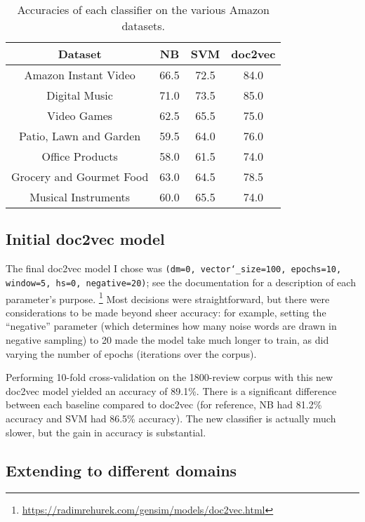 \documentclass[12pt,a4paper,twoside,twocolumn]{article}
\begin{document}
\begin{table*}[t]
\centering
\begin{tabular}{|c|c|c|c|}
\hline
\textbf{Dataset} & \textbf{NB} & \textbf{SVM} & \textbf{doc2vec}\\ \hline

Amazon Instant Video & 66.5 & 72.5 & 84.0 \\ \hline
Digital Music & 71.0 & 73.5 & 85.0 \\ \hline
Video Games & 62.5 & 65.5 & 75.0 \\ \hline
Patio, Lawn and Garden & 59.5 & 64.0 & 76.0 \\ \hline
Office Products & 58.0 & 61.5 & 74.0 \\ \hline
Grocery and Gourmet Food & 63.0 & 64.5 & 78.5 \\ \hline
Musical Instruments & 60.0 & 65.5 & 74.0 \\ \hline

\end{tabular}
\caption{Accuracies of each classifier on the various Amazon datasets.}
\end{table*}

\subsection{Initial doc2vec model}

The final doc2vec model I chose was \texttt{(dm=0, vector\char`_size=100, epochs=10, window=5, hs=0, negative=20)}; see the documentation for a description of each parameter's purpose. \footnote{\url{https://radimrehurek.com/gensim/models/doc2vec.html}} Most decisions were straightforward, but there were considerations to be made beyond sheer accuracy: for example, setting the ``negative'' parameter (which determines how many noise words are drawn in negative sampling) to 20 made the model take much longer to train, as did varying the number of epochs (iterations over the corpus).

Performing 10-fold cross-validation on the 1800-review corpus with this new doc2vec model yielded an accuracy of 89.1\%. There is a significant difference between each baseline compared to doc2vec (for reference, NB had 81.2\% accuracy and SVM had 86.5\% accuracy). The new classifier is actually much slower, but the gain in accuracy is substantial.

\vspace{100px}

\subsection{Extending to different domains}
\end{document}
